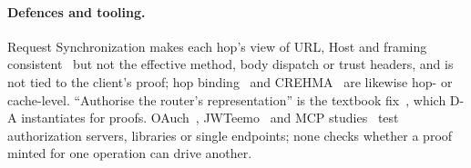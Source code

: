 \paragraph{Defences and tooling.} Request Synchronization makes each hop's
view of URL, Host and framing consistent~\cite{topcuoglu2025sync} but not the
effective method, body dispatch or trust headers, and is not tied to the
client's proof; hop binding~\cite{nygren2025binding} and
CREHMA~\cite{nguyen2020crehma} are likewise hop- or cache-level. ``Authorise
the router's representation'' is the textbook fix~\cite{p2:spring2016_5007},
which D-A instantiates for proofs. OAuch~\cite{philippaerts2022oauch},
JWTeemo~\cite{yang2026jwteemo} and MCP studies~\cite{zhou2026mcp,padilla2026mcp,mcpconf369}
test authorization servers, libraries or single endpoints; none checks whether
a proof minted for one operation can drive another.

